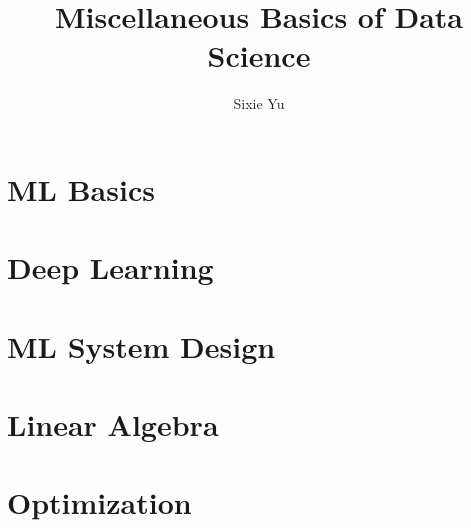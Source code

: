 \documentclass{article}
\title{Miscellaneous Basics of Data Science }
\author{Sixie Yu}
\date{ }
\begin{document}
\maketitle
\tableofcontents

\section{ML Basics}


\section{Deep Learning}


\section{ML System Design}


\section{Linear Algebra}



\section{Optimization}





\end{document}
